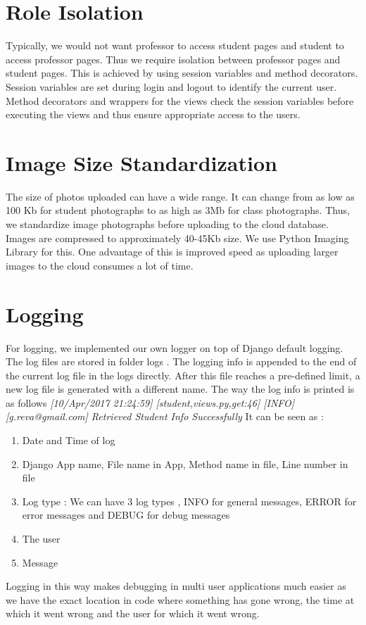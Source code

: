 \documentclass[paper=a4, fontsize=15pt]{scrartcl}
\begin{document}
\section{Role Isolation}
Typically, we would not want professor to access student pages and student to access professor pages. Thus we require isolation between professor pages and student pages. This is achieved by using session variables and method decorators.
Session variables are set during login and logout to identify the current user.
Method decorators and wrappers for the views check the session variables before executing the views and thus ensure appropriate access to the users.

\section{Image Size Standardization}
The size of photos uploaded can have a wide range. It can change from as low as 100 Kb for student photographs to as high as 3Mb for class photographs. Thus, we standardize image photographs before uploading to the cloud database. Images are compressed to approximately 40-45Kb size. We use Python Imaging Library for this. One advantage of this is improved speed as uploading larger images to the cloud consumes a lot of time.

\pagebreak
\section{Logging}
For logging, we implemented our own logger on top of Django default logging. The log files are stored in folder logs . The logging info is appended to the end of the current log file in the logs directly. After this file reaches a pre-defined limit, a new log file is generated with a different name. \newline \newline
The way the log info is printed is as follows \newline
\textit{[10/Apr/2017 21:24:59] [student,views.py,get:46] [INFO] [g.reva@gmail.com] Retrieved Student Info Successfully
} \newline \newline
It can be seen as :
\begin{enumerate}
	\item Date and Time of log
    \item Django App name, File name in App, Method name in file, Line number in file
	\item Log type : We can have 3 log types , INFO for general messages, ERROR for error messages and DEBUG for debug messages
    \item The user
    \item Message
\end{enumerate}
Logging in this way makes debugging in multi user applications much easier as we have the exact location in code where something has gone wrong, the time at which it went wrong and the user for which it went wrong.

\end{document}
